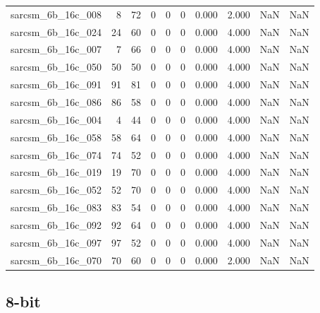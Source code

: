 \documentclass{article}
\begin{document}
\begin{longtable}{lrrrrrrrrr}
sarcsm\_6b\_16c\_008 & 8 & 72 & 0 & 0 & 0 & 0.000 & 2.000 & NaN & NaN \\
sarcsm\_6b\_16c\_024 & 24 & 60 & 0 & 0 & 0 & 0.000 & 4.000 & NaN & NaN \\
sarcsm\_6b\_16c\_007 & 7 & 66 & 0 & 0 & 0 & 0.000 & 4.000 & NaN & NaN \\
sarcsm\_6b\_16c\_050 & 50 & 50 & 0 & 0 & 0 & 0.000 & 4.000 & NaN & NaN \\
sarcsm\_6b\_16c\_091 & 91 & 81 & 0 & 0 & 0 & 0.000 & 4.000 & NaN & NaN \\
sarcsm\_6b\_16c\_086 & 86 & 58 & 0 & 0 & 0 & 0.000 & 4.000 & NaN & NaN \\
sarcsm\_6b\_16c\_004 & 4 & 44 & 0 & 0 & 0 & 0.000 & 4.000 & NaN & NaN \\
sarcsm\_6b\_16c\_058 & 58 & 64 & 0 & 0 & 0 & 0.000 & 4.000 & NaN & NaN \\
sarcsm\_6b\_16c\_074 & 74 & 52 & 0 & 0 & 0 & 0.000 & 4.000 & NaN & NaN \\
sarcsm\_6b\_16c\_019 & 19 & 70 & 0 & 0 & 0 & 0.000 & 4.000 & NaN & NaN \\
sarcsm\_6b\_16c\_052 & 52 & 70 & 0 & 0 & 0 & 0.000 & 4.000 & NaN & NaN \\
sarcsm\_6b\_16c\_083 & 83 & 54 & 0 & 0 & 0 & 0.000 & 4.000 & NaN & NaN \\
sarcsm\_6b\_16c\_092 & 92 & 64 & 0 & 0 & 0 & 0.000 & 4.000 & NaN & NaN \\
sarcsm\_6b\_16c\_097 & 97 & 52 & 0 & 0 & 0 & 0.000 & 4.000 & NaN & NaN \\
sarcsm\_6b\_16c\_070 & 70 & 60 & 0 & 0 & 0 & 0.000 & 2.000 & NaN & NaN \\
\end{longtable}

\subsection*{8-bit}
\end{document}
